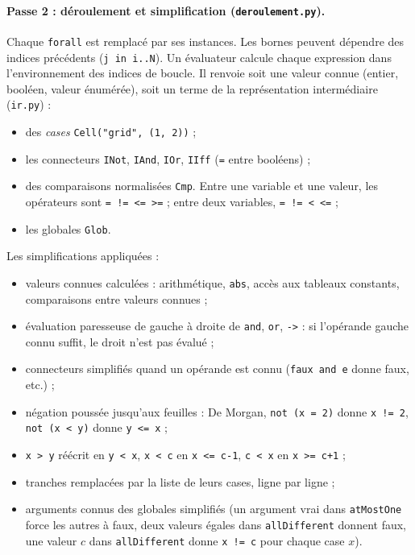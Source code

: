 \documentclass[11pt,a4paper]{article}
\newcommand{\code}[1]{\texttt{#1}}
\begin{document}
\paragraph{Passe 2 : déroulement et simplification (\code{deroulement.py}).} Chaque
\code{forall} est remplacé par ses instances. Les bornes peuvent dépendre des indices
précédents (\code{j in i..N}). Un évaluateur calcule chaque expression dans l'environnement des
indices de boucle. Il renvoie soit une valeur connue (entier, booléen, valeur énumérée), soit
un terme de la représentation intermédiaire (\code{ir.py}) :
\begin{itemize}
  \item des \emph{cases} \code{Cell("grid", (1, 2))} ;
  \item les connecteurs \code{INot}, \code{IAnd}, \code{IOr}, \code{IIff} (\code{=} entre
        booléens) ;
  \item des comparaisons normalisées \code{Cmp}. Entre une variable et une valeur, les
        opérateurs sont \code{= != <= >=} ; entre deux variables, \code{= != < <=} ;
  \item les globales \code{Glob}.
\end{itemize}
Les simplifications appliquées :
\begin{itemize}
  \item valeurs connues calculées : arithmétique, \code{abs}, accès aux tableaux constants,
        comparaisons entre valeurs connues ;
  \item évaluation paresseuse de gauche à droite de \code{and}, \code{or}, \code{->} : si
        l'opérande gauche connu suffit, le droit n'est pas évalué ;
  \item connecteurs simplifiés quand un opérande est connu (\code{faux and e} donne faux,
        etc.) ;
  \item négation poussée jusqu'aux feuilles : De Morgan, \code{not (x = 2)} donne \code{x != 2},
        \code{not (x < y)} donne \code{y <= x} ;
  \item \code{x > y} réécrit en \code{y < x}, \code{x < c} en \code{x <= c-1}, \code{c < x}
        en \code{x >= c+1} ;
  \item tranches remplacées par la liste de leurs cases, ligne par ligne ;
  \item arguments connus des globales simplifiés (un argument vrai dans \code{atMostOne}
        force les autres à faux, deux valeurs égales dans \code{allDifferent} donnent faux,
        une valeur $c$ dans \code{allDifferent} donne \code{x != c} pour chaque case $x$).
\end{itemize}
\end{document}
